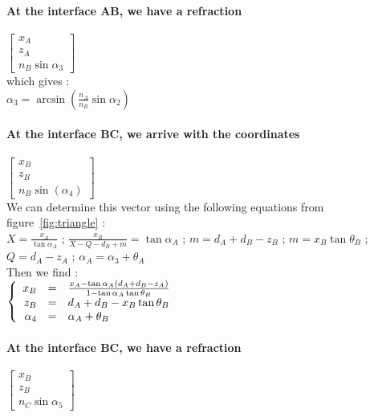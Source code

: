 \paragraph*{At the interface AB, we have a refraction}
$\begin{bmatrix}x_A \\ z_A \\ n_B\sin\alpha_3\end{bmatrix}$\\

which gives :\\

$\alpha_3 = \arcsin\left(\frac{n_A}{n_B}\sin\alpha_2\right) $

\paragraph*{At the interface BC, we arrive with the coordinates}

$\begin{bmatrix}x_B \\ z_B \\ n_B\sin\left(\alpha_4\right)\end{bmatrix}$\\

We can determine this vector using the following equations from figure~\ref{fig:triangle} :\\

$X = \frac{x_A}{\tan\alpha_A}$ ; $\frac{x_B}{X-Q-d_B+m} = \tan\alpha_A$ ; $m = d_A+d_B-z_B$ ; $m = x_B\tan\theta_B$ ; $Q = d_A-z_A$ ; $\alpha_A = \alpha_3+\theta_A$\\

Then we find :\\
$\left \{
   \begin{array}{r c l}
      x_B  & = & \frac{x_A-\tan\alpha_A\left(d_A+d_B-z_A\right)}{1-\tan\alpha_A\tan\theta_B} \\
      z_B   & = & d_A+d_B-x_B\tan\theta_B \\
      \alpha_4 & = & \alpha_A+\theta_B
   \end{array}
\right.$

\paragraph*{At the interface BC, we have a refraction}
$\begin{bmatrix}x_B \\ z_B \\ n_C\sin\alpha_5\end{bmatrix}$\\

